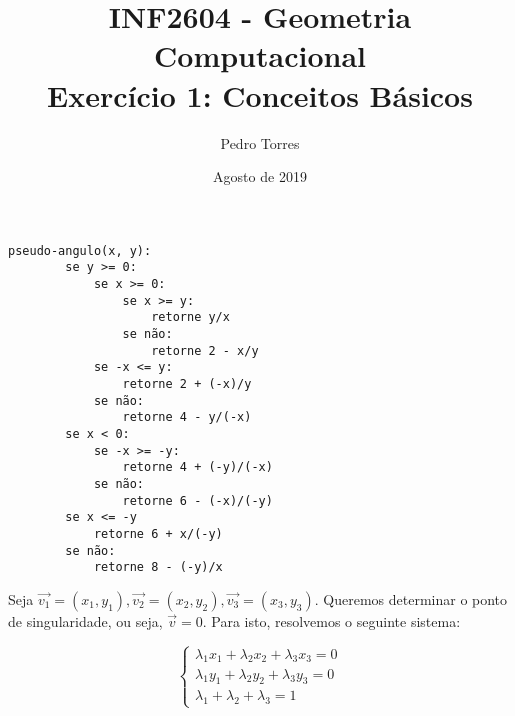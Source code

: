 \documentclass{exam}
\title{
	\normalsize INF2604 - Geometria Computacional\\
	\LARGE \textbf{Exercício 1: Conceitos Básicos}
	}
\author{Pedro Torres}
\date{Agosto de 2019}
\begin{document}
\maketitle

\begin{questions}

\question

\begin{Verbatim}[tabsize=4]
	pseudo-angulo(x, y):
		se y >= 0:
			se x >= 0:
				se x >= y:
					retorne y/x
				se não:
					retorne 2 - x/y
			se -x <= y:
				retorne 2 + (-x)/y
			se não:
				retorne 4 - y/(-x)
		se x < 0:
			se -x >= -y:
				retorne 4 + (-y)/(-x)	
			se não:
				retorne 6 - (-x)/(-y)
		se x <= -y
			retorne 6 + x/(-y)
		se não:
			retorne 8 - (-y)/x

\end{Verbatim}

\question Seja $\overrightarrow{v_1} = (x_1, y_1), \overrightarrow{v_2} = (x_2, y_2), \overrightarrow{v_3} = (x_3, y_3)$. Queremos determinar o ponto de singularidade, ou seja, $\overrightarrow{v} = 0$. Para isto, resolvemos o seguinte sistema:

\begin{equation}
	\begin{cases}
		\lambda_1 x_1 + \lambda_2 x_2 + \lambda_3 x_3 = 0 \\
		\lambda_1 y_1 + \lambda_2 y_2 + \lambda_3 y_3 = 0 \\
		\lambda_1 + \lambda_2 + \lambda_3 = 1	
	\end{cases}
\end{equation}

\question
{}

\end{questions}
\end{document}

